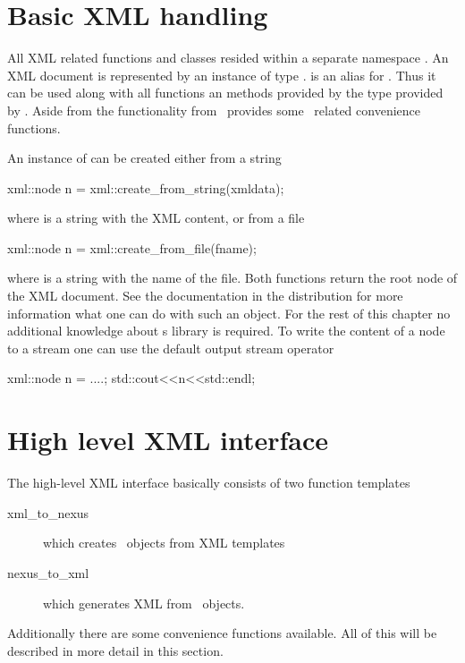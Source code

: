 \section{Basic XML handling}{\label{sec:xml:basic}

All XML related functions and classes resided within a separate namespace 
. An XML document is represented by an instance of 
type .  is an alias for . 
Thus it can be used along with all functions an methods provided by the 
 type provided by . Aside from the 
functionality from  \libpniio\ provides some 
\nexus\ related convenience functions. 

An instance of  can be created either from a string
\begin{cppcode}
    xml::node n = xml::create_from_string(xmldata);
\end{cppcode}
where  is a string with the XML content, 
or from a file
\begin{cppcode}
    xml::node n = xml::create_from_file(fname);
\end{cppcode}
where  is a string with the name of the file. Both functions 
return the root node of the XML document. See the 
documentation in the  distribution for more information what one can
do with such an object. For the rest of this chapter no additional knowledge
about s  library is required.
To write the content of a node to a stream one can use the default 
output stream operator
\begin{cppcode}
    xml::node n = ....;
    std::cout<<n<<std::endl;
\end{cppcode}


\section{High level XML interface}\label{sec:xml:highlevel}

The high-level XML interface basically consists of two function templates 
\begin{description}
\item[xml\_to\_nexus] which creates \nexus\ objects from XML templates
\item[nexus\_to\_xml] which generates XML from \nexus\ objects.
\end{description}
Additionally there are some convenience functions available. All of this will be
described in more detail in this section.

}
